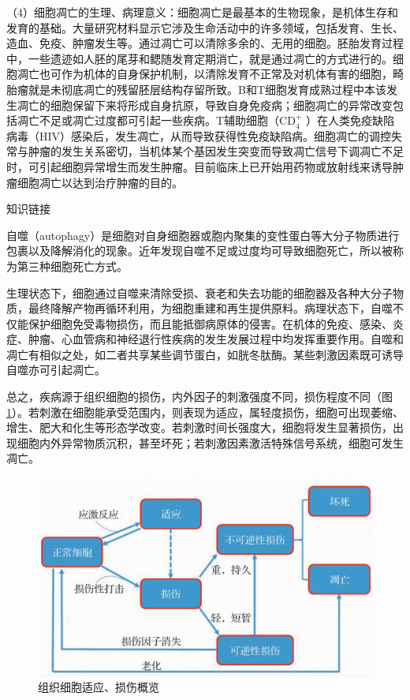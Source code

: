 （4）细胞凋亡的生理、病理意义：细胞凋亡是最基本的生物现象，是机体生存和发育的基础。大量研究材料显示它涉及生命活动中的许多领域，包括发育、生长、造血、免疫、肿瘤发生等。通过凋亡可以清除多余的、无用的细胞。胚胎发育过程中，一些遗迹如人胚的尾芽和鳃随发育定期消亡，就是通过凋亡的方式进行的。细胞凋亡也可作为机体的自身保护机制，以清除发育不正常及对机体有害的细胞，畸胎瘤就是未彻底凋亡的残留胚层结构存留所致。B和T细胞发育成熟过程中本该发生凋亡的细胞保留下来将形成自身抗原，导致自身免疫病；细胞凋亡的异常改变包括凋亡不足或凋亡过度都可引起一些疾病。T辅助细胞（$\text{CD}^+_4$
）在人类免疫缺陷病毒（HIV）感染后，发生凋亡，从而导致获得性免疫缺陷病。细胞凋亡的调控失常与肿瘤的发生关系密切，当机体某个基因发生突变而导致凋亡信号下调凋亡不足时，可引起细胞异常增生而发生肿瘤。目前临床上已开始用药物或放射线来诱导肿瘤细胞凋亡以达到治疗肿瘤的目的。

{知识链接}

自噬（autophagy）是细胞对自身细胞器或胞内聚集的变性蛋白等大分子物质进行包裹以及降解消化的现象。近年发现自噬不足或过度均可导致细胞死亡，所以被称为第三种细胞死亡方式。

生理状态下，细胞通过自噬来清除受损、衰老和失去功能的细胞器及各种大分子物质，最终降解产物再循环利用，为细胞重建和再生提供原料。病理状态下，自噬不仅能保护细胞免受毒物损伤，而且能抵御病原体的侵害。在机体的免疫、感染、炎症、肿瘤、心血管病和神经退行性疾病的发生发展过程中均发挥重要作用。自噬和凋亡有相似之处，如二者共享某些调节蛋白，如胱冬肽酶。某些刺激因素既可诱导自噬亦可引起凋亡。

总之，疾病源于组织细胞的损伤，内外因子的刺激强度不同，损伤程度不同（图\ref{fig1-20}）。若刺激在细胞能承受范围内，则表现为适应，属轻度损伤，细胞可出现萎缩、增生、肥大和化生等形态学改变。若刺激时间长强度大，细胞将发生显著损伤，出现细胞内外异常物质沉积，甚至坏死；若刺激因素激活特殊信号系统，细胞可发生凋亡。

\begin{figure}[!htbp]
	\centering
    \includegraphics{./images/Image00023.jpg}
	\caption{组织细胞适应、损伤概览}
	\label{fig1-20} 
    \end{figure} 

